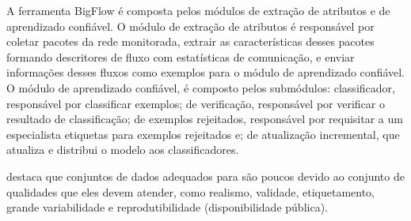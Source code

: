 A ferramenta BigFlow é composta pelos módulos de extração de atributos e de
aprendizado confiável. O módulo de extração de atributos é responsável por
coletar pacotes da rede monitorada,
extrair as características desses pacotes formando descritores de fluxo
com estatísticas de comunicação, e enviar informações desses fluxos como
exemplos para o módulo de aprendizado confiável.
O módulo de aprendizado confiável, é composto pelos submódulos:
classificador, responsável por classificar exemplos;
de verificação, responsável por verificar o resultado de classificação;
de exemplos rejeitados, responsável por requisitar a um especialista
etiquetas para exemplos rejeitados e;
de atualização incremental, que atualiza e distribui o modelo aos classificadores.





 destaca que conjuntos de dados adequados para \nids são
poucos devido ao conjunto de qualidades que eles devem atender, como
realismo, validade, etiquetamento, grande variabilidade e reprodutibilidade
(disponibilidade pública).

